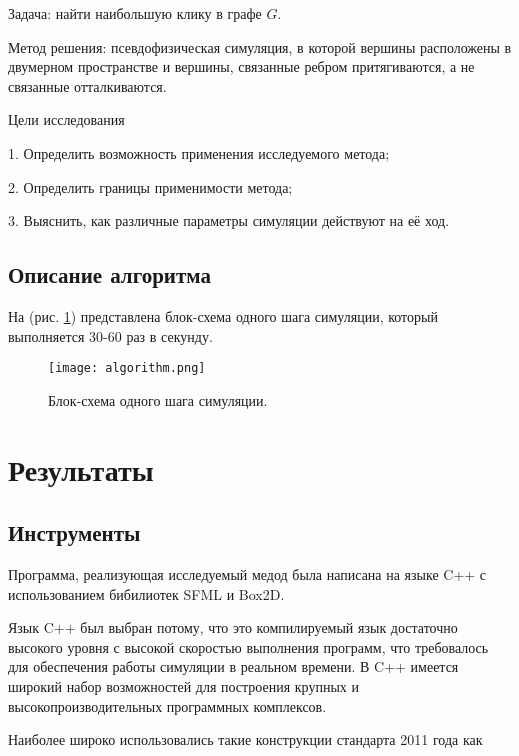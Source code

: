     Задача: найти наибольшую клику в графе $G$.

    Метод решения: псевдофизическая симуляция, в которой вершины расположены в
    двумерном пространстве и вершины, связанные ребром притягиваются, а не связанные
    отталкиваются.

    Цели исследования

      1.
      Определить возможность применения исследуемого метода;
      
      2.
      Определить границы применимости метода;
      
      3.
      Выяснить, как различные параметры симуляции действуют на её ход.
  \subsection{Описание алгоритма}
    На (рис. \ref{algorithm_pic}) представлена блок-схема одного шага симуляции,
    который выполняется 30-60 раз в секунду.

    \begin{figure}
      \centering
      \texttt{[image: algorithm.png]}
      \caption{Блок-схема одного шага симуляции.}
      \label{algorithm_pic}
    \end{figure}

\section{Результаты}
  \subsection{Инструменты}
  \label{tools_subsect}
    Программа, реализующая исследуемый медод была написана на языке C++ с использованием
    бибилиотек SFML и Box2D.

    Язык C++ был выбран потому, что это компилируемый язык достаточно высокого
    уровня с высокой скоростью выполнения программ, что требовалось для обеспечения
    работы симуляции в реальном времени.
    В C++ имеется широкий набор возможностей для построения крупных и высокопроизводительных
    программных комплексов.

    Наиболее широко использовались такие конструкции стандарта 2011 года как

      

